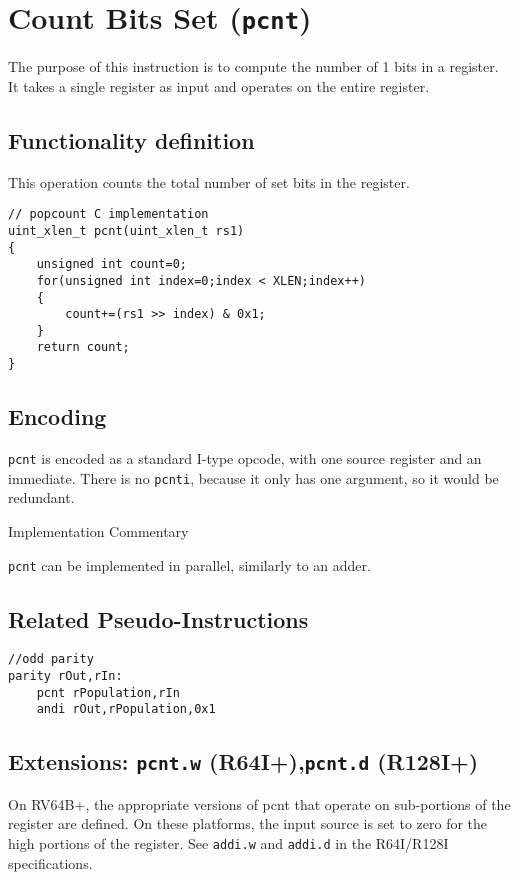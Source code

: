 \section{Count Bits Set (\texttt{pcnt})}

The purpose of this instruction is to compute the number of 1 bits in a
register. It takes a single register as input and operates on the entire
register.

\subsection{Functionality definition}

This operation counts the total number of set bits in the register.

\begin{verbatim}
// popcount C implementation
uint_xlen_t pcnt(uint_xlen_t rs1)
{
    unsigned int count=0;
    for(unsigned int index=0;index < XLEN;index++)
    {
        count+=(rs1 >> index) & 0x1;
    }
    return count;
}
\end{verbatim}

\subsection{Encoding}



\texttt{pcnt} is encoded as a standard I-type opcode, with one source
register and an immediate. There is no \texttt{pcnti}, because it only
has one argument, so it would be redundant.

Implementation Commentary

\texttt{pcnt} can be implemented in parallel, similarly to an adder.

\subsection{Related Pseudo-Instructions}

\begin{verbatim}
//odd parity
parity rOut,rIn:
    pcnt rPopulation,rIn
    andi rOut,rPopulation,0x1
\end{verbatim}

\subsection{Extensions: \texttt{pcnt.w} (R64I+),\texttt{pcnt.d} (R128I+)}

On RV64B+, the appropriate versions of pcnt that operate on sub-portions
of the register are defined. On these platforms, the input source is set
to zero for the high portions of the register. See \texttt{addi.w} and
\texttt{addi.d} in the R64I/R128I specifications.

